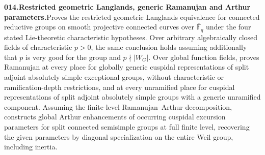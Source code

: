 \documentclass[11pt,a4paper]{article}
\begin{document}
  \par \begin{minipage}{\linewidth}
  \fontsize{10.5}{12.6}\selectfont\RaggedRight
  \hypertarget{result 014}{}
  {\bfseries\textcolor{muted}{014.}\enspace Restricted geometric Langlands, generic Ramanujan and Arthur parameters.}\enspace Proves the restricted geometric Langlands equivalence for connected reductive groups on smooth projective connected curves over $\overline{\mathbb F}_q$ under the four stated Lie-theoretic characteristic hypotheses. Over arbitrary algebraically closed fields of characteristic $p>0$, the same conclusion holds assuming additionally that $p$ is very good for the group and $p\nmid |W_G|$. Over global function fields, proves Ramanujan at every place for globally generic cuspidal representations of split adjoint absolutely simple exceptional groups, without characteristic or ramification-depth restrictions, and at every unramified place for cuspidal representations of split adjoint absolutely simple groups with a generic unramified component. Assuming the finite-level Ramanujan--Arthur decomposition, constructs global Arthur enhancements of occurring cuspidal excursion parameters for split connected semisimple groups at full finite level, recovering the given parameters by diagonal specialization on the entire Weil group, including inertia.\par

\end{minipage}
\end{document}
